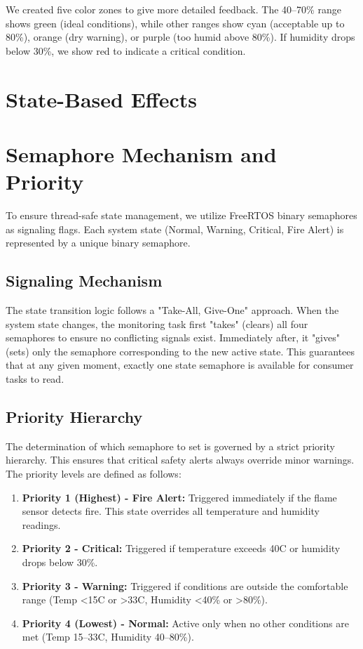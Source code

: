 We created five color zones to give more detailed feedback. The 40--70\% range shows green (ideal conditions), while other ranges show cyan (acceptable up to 80\%), orange (dry warning), or purple (too humid above 80\%). If humidity drops below 30\%, we show red to indicate a critical condition.

\section{State-Based Effects}

\section{Semaphore Mechanism and Priority}

To ensure thread-safe state management, we utilize FreeRTOS binary semaphores as signaling flags. Each system state (Normal, Warning, Critical, Fire Alert) is represented by a unique binary semaphore.

\subsection{Signaling Mechanism}
The state transition logic follows a "Take-All, Give-One" approach. When the system state changes, the monitoring task first "takes" (clears) all four semaphores to ensure no conflicting signals exist. Immediately after, it "gives" (sets) only the semaphore corresponding to the new active state. This guarantees that at any given moment, exactly one state semaphore is available for consumer tasks to read.

\subsection{Priority Hierarchy}
The determination of which semaphore to set is governed by a strict priority hierarchy. This ensures that critical safety alerts always override minor warnings. The priority levels are defined as follows:

\begin{enumerate}
    \item \textbf{Priority 1 (Highest) - Fire Alert:} Triggered immediately if the flame sensor detects fire. This state overrides all temperature and humidity readings.
    \item \textbf{Priority 2 - Critical:} Triggered if temperature exceeds 40\textdegree C or humidity drops below 30\%.
    \item \textbf{Priority 3 - Warning:} Triggered if conditions are outside the comfortable range (Temp \textless 15\textdegree C or \textgreater 33\textdegree C, Humidity \textless 40\% or \textgreater 80\%).
    \item \textbf{Priority 4 (Lowest) - Normal:} Active only when no other conditions are met (Temp 15--33\textdegree C, Humidity 40--80\%).
\end{enumerate}

